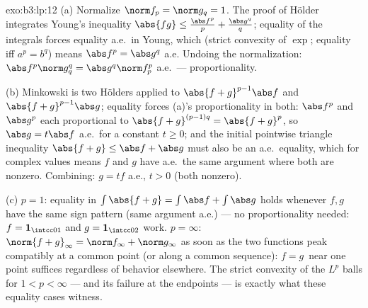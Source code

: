 \begin{solution}{exo:b3:lp:12}
(a) Normalize $\norm f_p = \norm g_q = 1$. The proof of
H\"older integrates Young's inequality $\abs{fg} \leq
\frac{\abs f^p}p + \frac{\abs g^q}q$; equality of the
integrals forces equality a.e.\ in Young, which (strict
convexity of $\exp$; equality iff $a^p = b^q$) means $\abs
f^p = \abs g^q$ a.e. Undoing the normalization:
$\abs f^p\norm g_q^q = \abs g^q\norm f_p^p$ a.e.\ ---
proportionality.

(b) Minkowski is two H\"olders applied to $\abs{f + g}^{p-1}
\abs f$ and $\abs{f+g}^{p-1}\abs g$; equality forces (a)'s
proportionality in both: $\abs f^p$ and $\abs g^p$ each
proportional to $\abs{f+g}^{(p-1)q} = \abs{f+g}^p$, so
$\abs g = t\abs f$ a.e.\ for a constant $t \geq 0$; and the
initial pointwise triangle inequality $\abs{f + g} \leq
\abs f + \abs g$ must also be an a.e.\ equality, which for
complex values means $f$ and $g$ have a.e.\ the same
argument where both are nonzero. Combining: $g = tf$ a.e.,
$t > 0$ (both nonzero).

(c) $p = 1$: equality in $\int\abs{f + g} = \int\abs f +
\int\abs g$ holds whenever $f, g$ have the same sign
pattern (same argument a.e.) --- no proportionality needed:
$f = \mathbf 1_{\intcc01}$ and $g = \mathbf 1_{\intcc02}$
work. $p = \infty$: $\norm{f+g}_\infty = \norm f_\infty +
\norm g_\infty$ as soon as the two functions peak
compatibly at a common point (or along a common sequence):
$f = g\,$ near one point suffices regardless of behavior
elsewhere. The strict convexity of the $L^p$ balls for $1 <
p < \infty$ --- and its failure at the endpoints --- is
exactly what these equality cases witness.
\end{solution}

